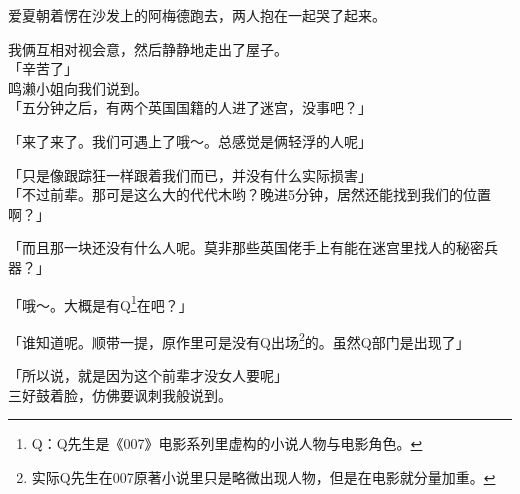 爱夏朝着愣在沙发上的阿梅德跑去，两人抱在一起哭了起来。

我俩互相对视会意，然后静静地走出了屋子。\\

「辛苦了」\\

鸣濑小姐向我们说到。\\

「五分钟之后，有两个英国国籍的人进了迷宫，没事吧？」

「来了来了。我们可遇上了哦～。总感觉是俩轻浮的人呢」

「只是像跟踪狂一样跟着我们而已，并没有什么实际损害」\\

「不过前辈。那可是这么大的代代木哟？晚进5分钟，居然还能找到我们的位置啊？」

「而且那一块还没有什么人呢。莫非那些英国佬手上有能在迷宫里找人的秘密兵器？」

「哦～。大概是有Q\footnote{Q：Q先生是《007》电影系列里虚构的小说人物与电影角色。}在吧？」

「谁知道呢。顺带一提，原作里可是没有Q出场\footnote{实际Q先生在007原著小说里只是略微出现人物，但是在电影就分量加重。}的。虽然Q部门是出现了」

「所以说，就是因为这个前辈才没女人要呢」\\

三好鼓着脸，仿佛要讽刺我般说到。\\

